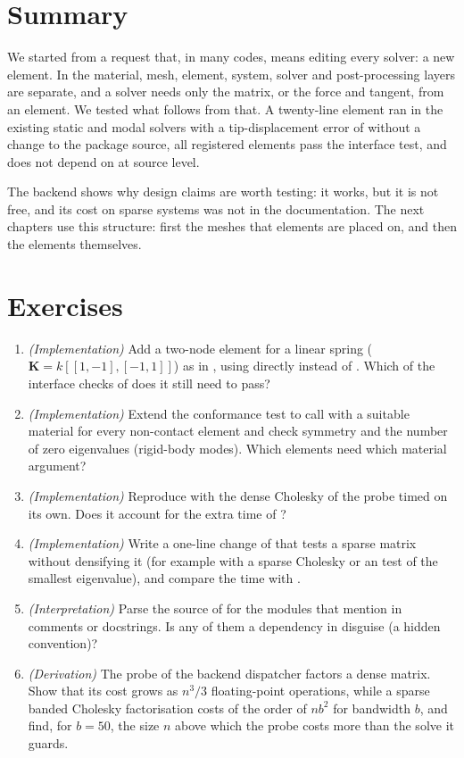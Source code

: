 \section{Summary}\label{sec:ar-summary}

We started from a request that, in many codes, means editing every solver: a new element. In \fea{} the material, mesh, element, system, solver and post-processing layers are separate, and a solver needs only the matrix, or the force and tangent, from an element. We tested what follows from that. A twenty-line element ran in the existing static and modal solvers with a tip-displacement error of \cdeExtStatic{} without a change to the package source, all \cdeRegTotal{} registered elements pass the interface test, and \rom{} does not depend on \fea{} at source level.

The  backend shows why design claims are worth testing: it works, but it is not free, and its cost on sparse systems was not in the documentation. The next chapters use this structure: first the meshes that elements are placed on, and then the elements themselves.

\section*{Exercises}\label{sec:ar-exercises}
\begin{enumerate}
\item \emph{(Implementation)} Add a two-node element for a linear spring ($\bm K=k[[1,-1],[-1,1]]$) as in , using  directly instead of . Which of the interface checks of  does it still need to pass?
\item \emph{(Implementation)} Extend the conformance test to call  with a suitable material for every non-contact element and check symmetry and the number of zero eigenvalues (rigid-body modes). Which elements need which material argument?
\item \emph{(Implementation)} Reproduce  with the dense Cholesky of the probe timed on its own. Does it account for the extra time of ?
\item \emph{(Implementation)} Write a one-line change of  that tests a sparse matrix without densifying it (for example with a sparse Cholesky or an  test of the smallest eigenvalue), and compare the time with .
\item \emph{(Interpretation)} Parse the source of \rom{} for the modules that mention \fea{} in comments or docstrings. Is any of them a dependency in disguise (a hidden convention)?
\item \emph{(Derivation)} The probe of the backend dispatcher factors a dense matrix. Show that its cost grows as $n^3/3$ floating-point operations, while a sparse banded Cholesky factorisation costs of the order of $nb^2$ for bandwidth $b$, and find, for $b=50$, the size $n$ above which the probe costs more than the solve it guards.
\end{enumerate}

